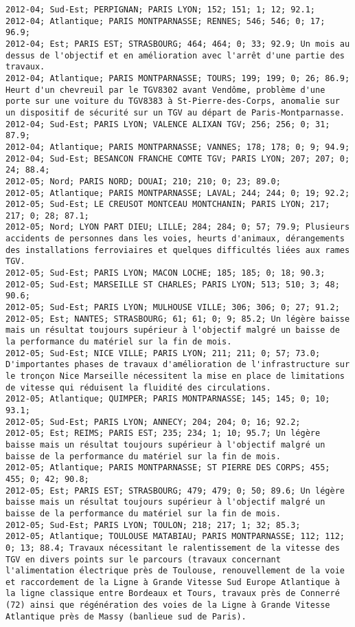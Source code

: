 \documentclass{article}
\begin{document}
\begin{Verbatim}[commandchars=\\\{\}]
2012-04; Sud-Est; PERPIGNAN; PARIS LYON; 152; 151; 1; 12; 92.1; 
2012-04; Atlantique; PARIS MONTPARNASSE; RENNES; 546; 546; 0; 17; 96.9; 
2012-04; Est; PARIS EST; STRASBOURG; 464; 464; 0; 33; 92.9; Un mois au dessus de l'objectif et en amélioration avec l'arrêt d'une partie des travaux.
2012-04; Atlantique; PARIS MONTPARNASSE; TOURS; 199; 199; 0; 26; 86.9; Heurt d'un chevreuil par le TGV8302 avant Vendôme, problème d'une porte sur une voiture du TGV8383 à St-Pierre-des-Corps, anomalie sur un dispositif de sécurité sur un TGV au départ de Paris-Montparnasse.
2012-04; Sud-Est; PARIS LYON; VALENCE ALIXAN TGV; 256; 256; 0; 31; 87.9; 
2012-04; Atlantique; PARIS MONTPARNASSE; VANNES; 178; 178; 0; 9; 94.9; 
2012-04; Sud-Est; BESANCON FRANCHE COMTE TGV; PARIS LYON; 207; 207; 0; 24; 88.4; 
2012-05; Nord; PARIS NORD; DOUAI; 210; 210; 0; 23; 89.0; 
2012-05; Atlantique; PARIS MONTPARNASSE; LAVAL; 244; 244; 0; 19; 92.2; 
2012-05; Sud-Est; LE CREUSOT MONTCEAU MONTCHANIN; PARIS LYON; 217; 217; 0; 28; 87.1; 
2012-05; Nord; LYON PART DIEU; LILLE; 284; 284; 0; 57; 79.9; Plusieurs accidents de personnes dans les voies, heurts d'animaux, dérangements des installations ferroviaires et quelques difficultés liées aux rames TGV.
2012-05; Sud-Est; PARIS LYON; MACON LOCHE; 185; 185; 0; 18; 90.3; 
2012-05; Sud-Est; MARSEILLE ST CHARLES; PARIS LYON; 513; 510; 3; 48; 90.6; 
2012-05; Sud-Est; PARIS LYON; MULHOUSE VILLE; 306; 306; 0; 27; 91.2; 
2012-05; Est; NANTES; STRASBOURG; 61; 61; 0; 9; 85.2; Un légère baisse mais un résultat toujours supérieur à l'objectif malgré un baisse de la performance du matériel sur la fin de mois.
2012-05; Sud-Est; NICE VILLE; PARIS LYON; 211; 211; 0; 57; 73.0; D'importantes phases de travaux d'amélioration de l'infrastructure sur le tronçon Nice Marseille nécessitent la mise en place de limitations de vitesse qui réduisent la fluidité des circulations.
2012-05; Atlantique; QUIMPER; PARIS MONTPARNASSE; 145; 145; 0; 10; 93.1; 
2012-05; Sud-Est; PARIS LYON; ANNECY; 204; 204; 0; 16; 92.2; 
2012-05; Est; REIMS; PARIS EST; 235; 234; 1; 10; 95.7; Un légère baisse mais un résultat toujours supérieur à l'objectif malgré un baisse de la performance du matériel sur la fin de mois.
2012-05; Atlantique; PARIS MONTPARNASSE; ST PIERRE DES CORPS; 455; 455; 0; 42; 90.8; 
2012-05; Est; PARIS EST; STRASBOURG; 479; 479; 0; 50; 89.6; Un légère baisse mais un résultat toujours supérieur à l'objectif malgré un baisse de la performance du matériel sur la fin de mois.
2012-05; Sud-Est; PARIS LYON; TOULON; 218; 217; 1; 32; 85.3; 
2012-05; Atlantique; TOULOUSE MATABIAU; PARIS MONTPARNASSE; 112; 112; 0; 13; 88.4; Travaux nécessitant le ralentissement de la vitesse des TGV en divers points sur le parcours (travaux concernant l'alimentation électrique près de Toulouse, renouvellement de la voie et raccordement de la Ligne à Grande Vitesse Sud Europe Atlantique à la ligne classique entre Bordeaux et Tours, travaux près de Connerré (72) ainsi que régénération des voies de la Ligne à Grande Vitesse Atlantique près de Massy (banlieue sud de Paris).

\end{Verbatim}
\end{document}
